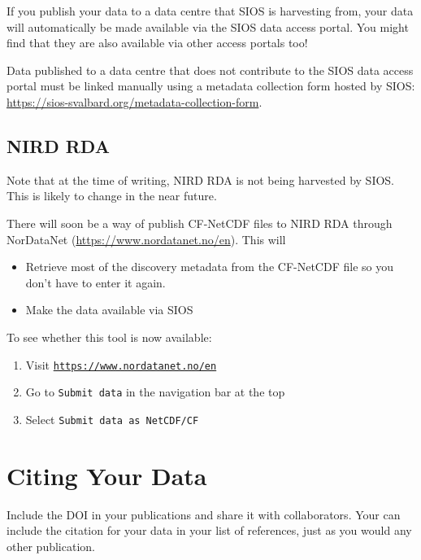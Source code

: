 \documentclass[a4paper,12pt]{article}
\begin{document}
If you publish your data to a data centre that SIOS is harvesting from, your data will automatically be made available via the SIOS data access portal. You might find that they are also available via other access portals too!
 
Data published to a data centre that does not contribute to the SIOS data access portal must be linked manually using a metadata collection form hosted by SIOS: \url{https://sios-svalbard.org/metadata-collection-form}.

\subsection{NIRD RDA}

Note that at the time of writing, NIRD RDA is not being harvested by SIOS. This is likely to change in the near future. 

There will soon be a way of publish CF-NetCDF files to NIRD RDA through NorDataNet (\url{https://www.nordatanet.no/en}). This will
\begin{itemize}
\item Retrieve most of the discovery metadata from the CF-NetCDF file so you don't have to enter it again.
\item Make the data available via SIOS
\end{itemize}

To see whether this tool is now available: 

\begin{enumerate}[label=\arabic*.]
    \item Visit \href{https://www.nordatanet.no/en}{\texttt{https://www.nordatanet.no/en}}
    \item Go to \texttt{Submit data} in the navigation bar at the top
    \item Select \texttt{Submit data as NetCDF/CF}
\end{enumerate}

\section{Citing Your Data}

Include the DOI in your publications and share it with collaborators. Your can include the citation for your data in your list of references, just as you would any other publication. 
\end{document}

